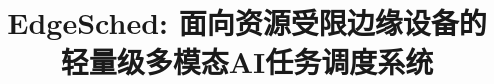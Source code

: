 \documentclass[conference]{IEEEtran}
\begin{document}
\title{EdgeSched: 面向资源受限边缘设备的\\轻量级多模态AI任务调度系统}

\author{
}

\maketitle












\end{document}
